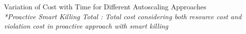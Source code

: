 Variation of Cost with Time for Different Autoscaling Approaches\\
\textit{*Proactive Smart Killing Total : Total cost considering both resource cost and violation cost in proactive approach with smart killing}